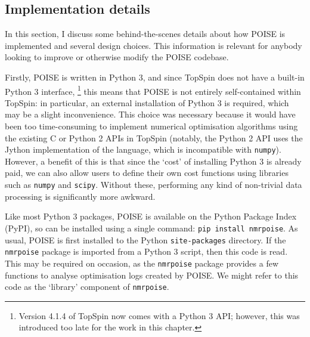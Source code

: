 \subsection{Implementation details}
\label{subsec:poise__implementation}

In this section, I discuss some behind-the-scenes details about how POISE is implemented and several design choices.
This information is relevant for anybody looking to improve or otherwise modify the POISE codebase.

Firstly, POISE is written in Python 3, and since TopSpin does not have a built-in Python 3 interface,%
\footnote{Version 4.1.4 of TopSpin now comes with a Python 3 API; however, this was introduced too late for the work in this chapter.}
this means that POISE is not entirely self-contained within TopSpin: in particular, an external installation of Python 3 is required, which may be a slight inconvenience.
This choice was necessary because it would have been too time-consuming to implement numerical optimisation algorithms using the existing C or Python 2 APIs in TopSpin (notably, the Python 2 API uses the Jython implementation of the language, which is incompatible with \texttt{numpy}).
However, a benefit of this is that since the `cost' of installing Python 3 is already paid, we can also allow users to define their own cost functions using libraries such as \texttt{numpy} and \texttt{scipy}.
Without these, performing any kind of non-trivial data processing is significantly more awkward.

Like most Python 3 packages, POISE is available on the Python Package Index (PyPI), so can be installed using a single command: \texttt{pip install nmrpoise}.
As usual, POISE is first installed to the Python \texttt{site-packages} directory.
If the \texttt{nmrpoise} package is imported from a Python 3 script, then this code is read.
This may be required on occasion, as the \texttt{nmrpoise} package provides a few functions to analyse optimisation logs created by POISE.
We might refer to this code as the `library' component of \texttt{nmrpoise}.

